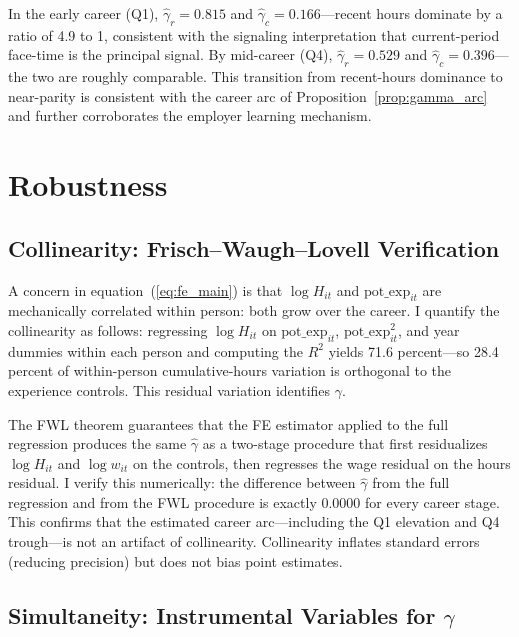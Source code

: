 \documentclass[12pt]{article}
\theoremstyle{definition}
\theoremstyle{remark}
\begin{document}
In the early career (Q1), $\hat{\gamma}_r = 0.815$ and $\hat{\gamma}_c = 0.166$---recent
hours dominate by a ratio of 4.9 to 1, consistent with the signaling interpretation that
current-period face-time is the principal signal. By mid-career (Q4), $\hat{\gamma}_r = 0.529$
and $\hat{\gamma}_c = 0.396$---the two are roughly comparable. This transition from recent-hours
dominance to near-parity is consistent with the career arc of Proposition~\ref{prop:gamma_arc}
and further corroborates the employer learning mechanism.

\section{Robustness}
\label{sec:robustness}

\subsection{Collinearity: Frisch--Waugh--Lovell Verification}

A concern in equation~(\ref{eq:fe_main}) is that $\log H_{it}$ and $\text{pot\_exp}_{it}$
are mechanically correlated within person: both grow over the career. I quantify the
collinearity as follows: regressing $\log H_{it}$ on $\text{pot\_exp}_{it}$, $\text{pot\_exp}_{it}^2$,
and year dummies within each person and computing the $R^2$ yields 71.6 percent---so 28.4
percent of within-person cumulative-hours variation is orthogonal to the experience controls.
This residual variation identifies $\gamma$.

The FWL theorem guarantees that the FE estimator applied to the full regression produces the
same $\hat{\gamma}$ as a two-stage procedure that first residualizes $\log H_{it}$ and $\log
w_{it}$ on the controls, then regresses the wage residual on the hours residual. I verify this
numerically: the difference between $\hat{\gamma}$ from the full regression and from the FWL
procedure is exactly 0.0000 for every career stage. This confirms that the estimated career
arc---including the Q1 elevation and Q4 trough---is not an artifact of collinearity.
Collinearity inflates standard errors (reducing precision) but does not bias point estimates.

\subsection{Simultaneity: Instrumental Variables for $\gamma$}
\end{document}
